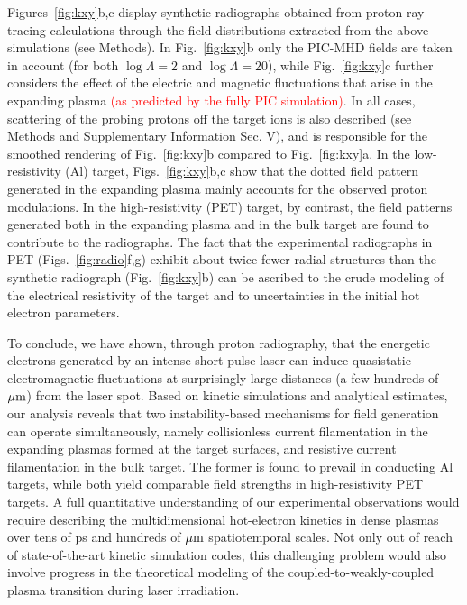 \documentclass[aps,twocolumn,showpacs,superscriptaddress]{revtex4}
\begin{document}
Figures~\ref{fig:kxy}b,c display synthetic radiographs obtained from proton ray-tracing calculations through the field distributions extracted from the above simulations (see Methods). In Fig.~\ref{fig:kxy}b only the PIC-MHD fields are taken in account (for both $\log \Lambda =2$ and $\log \Lambda = 20$), while Fig.~\ref{fig:kxy}c further considers the effect of the electric and magnetic fluctuations that arise in the expanding plasma \textcolor{red}{(as predicted by the fully PIC simulation)}. In all cases, scattering of the probing protons off the target ions is also described (see Methods and Supplementary Information Sec. V), and is responsible for the smoothed rendering of Fig.~\ref{fig:kxy}b compared to Fig.~\ref{fig:kxy}a. In the low-resistivity (Al) target,  Figs.~\ref{fig:kxy}b,c show that the dotted field pattern generated in the expanding plasma mainly accounts for the observed proton modulations. In the high-resistivity (PET) target, by contrast, the field patterns generated both in the expanding plasma and in the bulk target are found to contribute to the radiographs. The fact that
the experimental radiographs in PET (Figs.~\ref{fig:radio}f,g) exhibit about twice fewer radial structures than the synthetic radiograph (Fig.~\ref{fig:kxy}b) can be ascribed to the crude modeling of the electrical resistivity of the target and to uncertainties in the initial hot electron parameters.

To conclude, we have shown, through proton radiography, that the energetic electrons generated by an intense short-pulse laser can induce quasistatic electromagnetic fluctuations at surprisingly large distances (a few hundreds of $\rm \mu m$) from the laser spot. Based on kinetic simulations and analytical estimates, our analysis reveals that two instability-based mechanisms for field generation can operate simultaneously, namely collisionless current filamentation in the expanding plasmas formed at the target surfaces, and resistive current filamentation in the bulk target. The former is found to prevail in conducting Al targets, while both yield comparable field strengths in high-resistivity PET targets. A full quantitative understanding of our experimental observations would require describing the multidimensional hot-electron kinetics in dense plasmas over tens of ps and hundreds of $\rm \mu m$ spatiotemporal scales. Not only out of reach of state-of-the-art kinetic simulation codes, this challenging problem would also involve progress in the theoretical modeling of the coupled-to-weakly-coupled plasma transition during laser irradiation.
\end{document}
